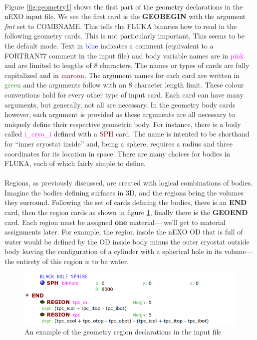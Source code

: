 \paragraph{}
Figure \ref{fig:geometry1} shows the first part of the geometry declarations in the nEXO input file. We see the first card is the \textbf{GEOBEGIN} with the argument \textit{fmt} set to COMBNAME. This tells the FLUKA binaries how to read in the following geometry cards. This is not particularly important. This seems to be the default mode. Text in \textcolor{blue}{blue} indicates a comment (equivalent to a FORTRAN77 comment in the input file) and body variable names are in \textcolor{magenta}{pink} and are limited to lengths of 8 characters. The names or types of cards are fully capitalized and in \textcolor{Maroon}{maroon}. The argument names for each card are written in \textcolor{ForestGreen}{green} and the arguments follow with an 8 character length limit. These colour conventions hold for every other type of input card. Each card can have many arguments, but generally, not all are necessary. In the geometry body cards however, each argument is provided as these arguments are all necessary to uniquely define their respective geometric body. For instance, there is a body called \textcolor{magenta}{i\_cryo\_i} defined with a \textcolor{Maroon}{SPH} card. The name is intented to be shorthand for ``inner cryostat inside'' and, being a sphere, requires a radius and three coordinates for its location in space. There are many choices for bodies in FLUKA, each of which fairly simple to define.

\paragraph{}
Regions, as previously discussed, are created with logical combinations of bodies. Imagine the bodies defining surfaces in 3D, and the regions being the volumes they surround. Following the set of cards defining the bodies, there is an \textbf{END} card, then the region cards as shown in figure \ref{fig:geometry2}, finally there is the \textbf{GEOEND} card. Each region must be assigned \textbf{one} material— we'll get to material assignments later. For example, the region inside the nEXO OD that is full of water would be defined by the OD inside body minus the outer cryostat outside body leaving the configuration of a cylinder with a spherical hole in its volume— the entirety of this region is to be water. 

\begin{figure}[h]
    \begin{center}
    \includegraphics[scale=0.5]{figures/geometry_2.png}
    \caption{An example of the geometry region declarations in the input file}
    \label{fig:geometry2}
    \end{center}
\end{figure}

